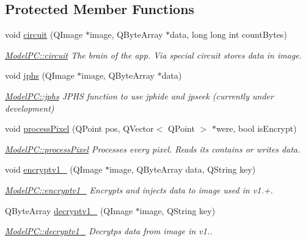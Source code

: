 \subsection*{Protected Member Functions}
\begin{DoxyCompactItemize}
\item 
void \hyperlink{class_model_p_c_a1d0091062a0c836b283ec2f67411623b}{circuit} (Q\+Image $\ast$image, Q\+Byte\+Array $\ast$data, long long int count\+Bytes)
\begin{DoxyCompactList}\small\item\em \hyperlink{class_model_p_c_a1d0091062a0c836b283ec2f67411623b}{Model\+P\+C\+::circuit} The brain of the app. Via special circuit stores data in image. \end{DoxyCompactList}\item 
void \hyperlink{class_model_p_c_a8bee0255c09449868c7e6097afaaf0cd}{jphs} (Q\+Image $\ast$image, Q\+Byte\+Array $\ast$data)
\begin{DoxyCompactList}\small\item\em \hyperlink{class_model_p_c_a8bee0255c09449868c7e6097afaaf0cd}{Model\+P\+C\+::jphs} J\+P\+HS function to use jphide and jpseek (currently under development) \end{DoxyCompactList}\item 
void \hyperlink{class_model_p_c_a1171f9fe1550133dc9053a46b4e5bcfd}{process\+Pixel} (Q\+Point pos, Q\+Vector$<$ Q\+Point $>$ $\ast$were, bool is\+Encrypt)
\begin{DoxyCompactList}\small\item\em \hyperlink{class_model_p_c_a1171f9fe1550133dc9053a46b4e5bcfd}{Model\+P\+C\+::process\+Pixel} Processes every pixel. Reads its contains or writes data. \end{DoxyCompactList}\item 
void \hyperlink{class_model_p_c_a4daefc3fb87a1f19172b9b20c987eb12}{encryptv1\+\_} (Q\+Image $\ast$image, Q\+Byte\+Array data, Q\+String key)
\begin{DoxyCompactList}\small\item\em \hyperlink{class_model_p_c_a4daefc3fb87a1f19172b9b20c987eb12}{Model\+P\+C\+::encryptv1\+\_} Encrypts and injects data to image used in v1.+. \end{DoxyCompactList}\item 
Q\+Byte\+Array \hyperlink{class_model_p_c_a4fe70ebbedfaf31d45a35f82d0f06caa}{decryptv1\+\_} (Q\+Image $\ast$image, Q\+String key)
\begin{DoxyCompactList}\small\item\em \hyperlink{class_model_p_c_a4fe70ebbedfaf31d45a35f82d0f06caa}{Model\+P\+C\+::decryptv1\+\_} Decrytps data from image in v1.. \end{DoxyCompactList}\item 

\end{DoxyCompactItemize}
